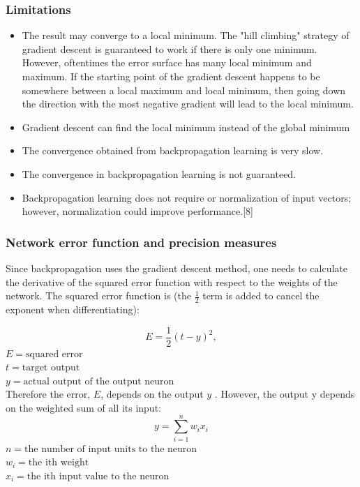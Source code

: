 \documentclass[a4paper,12pt]{article}
\begin{document}
\subsubsection{Limitations}

\begin{itemize}

 \item The result may converge to a local minimum. The "hill climbing" strategy of gradient descent is guaranteed to work if there is only one minimum. However, oftentimes the error surface has many local minimum and maximum. If the starting point of the gradient descent happens to be somewhere between a local maximum and local minimum, then going down the direction with the most negative gradient will lead to the local minimum.
    \item Gradient descent can find the local minimum instead of the global minimum
    \item The convergence obtained from backpropagation learning is very slow.
    \item The convergence in backpropagation learning is not guaranteed.
    \item Backpropagation learning does not require or normalization of input vectors; however, normalization could improve performance.[8]
\end{itemize}

\subsubsection{Network error function and precision measures}

Since backpropagation uses the gradient descent method, one needs to calculate the derivative of the squared error function with respect to the weights of the network. The squared error function is (the $\frac{1}{2}$ term is added to cancel the exponent when differentiating):

\begin{equation}
 E = \frac{1}{2}(t-y)^2,
\end{equation}
 $E = \text{squared error}$\\ 
 $t = \text{target output}$\\ 
 $y = \text{actual output of the output neuron}$\\


 Therefore the error, $E$, depends on the output $y$ . However, the output y depends on the weighted sum of all its input:
\begin{equation}
  	y = \sum_{i=1}^{n}w_ix_i
\end{equation}
	$n = \text{the number of input units to the neuron}$\\
	$w_i = \text{the ith weight}$\\
	$x_i = \text{the ith input value to the neuron}$\\
\end{document}
